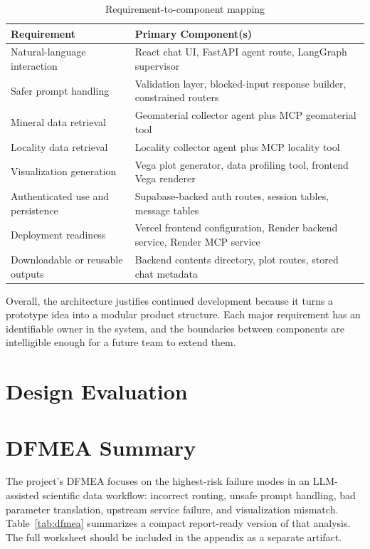 \documentclass[12pt,oneside]{report}
\begin{document}
\begin{table}[H]
\centering
\caption{Requirement-to-component mapping}
\label{tab:reqmap}
\begin{tabularx}{\textwidth}{>{\raggedright\arraybackslash}p{2.4in} X}
\toprule
\textbf{Requirement} & \textbf{Primary Component(s)} \\
\midrule
Natural-language interaction & React chat UI, FastAPI agent route, LangGraph supervisor \\
Safer prompt handling & Validation layer, blocked-input response builder, constrained routers \\
Mineral data retrieval & Geomaterial collector agent plus MCP geomaterial tool \\
Locality data retrieval & Locality collector agent plus MCP locality tool \\
Visualization generation & Vega plot generator, data profiling tool, frontend Vega renderer \\
Authenticated use and persistence & Supabase-backed auth routes, session tables, message tables \\
Deployment readiness & Vercel frontend configuration, Render backend service, Render MCP service \\
Downloadable or reusable outputs & Backend contents directory, plot routes, stored chat metadata \\
\bottomrule
\end{tabularx}
\end{table}

Overall, the architecture justifies continued development because it turns a prototype idea into a modular product structure. Each major requirement has an identifiable owner in the system, and the boundaries between components are intelligible enough for a future team to extend them.

\section{Design Evaluation}

\section{DFMEA Summary}

The project's DFMEA focuses on the highest-risk failure modes in an LLM-assisted scientific data workflow: incorrect routing, unsafe prompt handling, bad parameter translation, upstream service failure, and visualization mismatch. Table~\ref{tab:dfmea} summarizes a compact report-ready version of that analysis. The full worksheet should be included in the appendix as a separate artifact.
\end{document}
